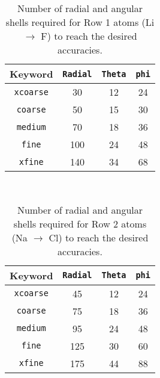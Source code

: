 \begin{table}[h]
\begin{center}
\caption{Number of radial and angular shells required for Row 1 atoms
  (Li $\rightarrow$ F) to reach the desired accuracies.}

\vspace{.2in}

  \begin{tabular}[right]{|c|c|c|c|} \hline
Keyword & {\tt Radial} & {\tt Theta} & {\tt phi} \\ \hline
{\tt xcoarse} & 30 & 12 & 24  \\ \hline
{\tt coarse}  & 50 & 15 & 30  \\ \hline
{\tt medium}  & 70 & 18 & 36  \\ \hline
{\tt fine}    &100 & 24 & 48  \\ \hline
{\tt xfine}   &140 & 34 & 68  \\ \hline
  \end{tabular} \\
\end{center}
\end{table}

\begin{table}[h]
\begin{center}
\caption{Number of radial and angular shells required for Row 2 atoms
  (Na $\rightarrow$ Cl) to reach the desired accuracies.}

\vspace{.2in}

  \begin{tabular}[right]{|c|c|c|c|} \hline
Keyword & {\tt Radial} & {\tt Theta} & {\tt phi} \\ \hline
{\tt xcoarse} & 45 & 12 & 24  \\ \hline
{\tt coarse}  & 75 & 18 & 36  \\ \hline
{\tt medium}  & 95 & 24 & 48  \\ \hline
{\tt fine}    &125 & 30 & 60  \\ \hline
{\tt xfine}   &175 & 44 & 88  \\ \hline
  \end{tabular} \\
\end{center}
\end{table}


